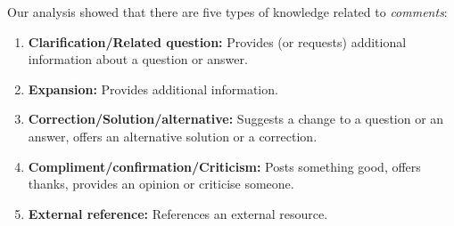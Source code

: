 \documentclass{sig-alternate-05-2015}
\begin{document}
	Our analysis showed that there are five types of knowledge related to \textit{comments}:
	\begin{enumerate}[\bfseries (1)]
		\item \textbf{Clarification/Related question:} Provides (or requests) additional information about a question or answer.
		\item \textbf{Expansion:} Provides additional information.
		\item \textbf{Correction/Solution/alternative:} Suggests a change to a question or an answer, offers an alternative solution or a correction.
		\item \textbf{Compliment/confirmation/Criticism:} Posts something good, offers thanks, provides an opinion or criticise someone.
		\item \textbf{External reference:} References an external resource.
	\end{enumerate}




\end{document}
